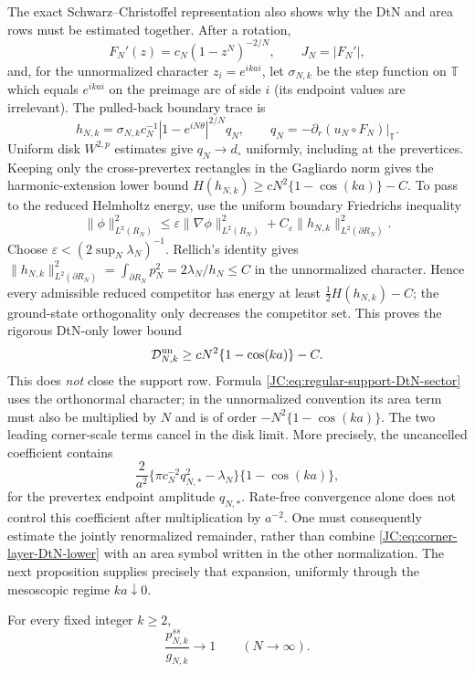 \begin{contract}
The exact Schwarz--Christoffel representation also shows why the DtN and
area rows must be estimated together.  After a rotation,
\[
 F_N'(z)=c_N(1-z^N)^{-2/N},\qquad J_N=|F_N'|,
\]
and, for the unnormalized character $z_i=e^{ikai}$, let
$\sigma_{N,k}$ be the step function on $\mathbb T$ which equals
$e^{ikai}$ on the preimage arc of side $i$ (its endpoint values are
irrelevant).  The pulled-back boundary trace is
\[
 h_{N,k}=\sigma_{N,k}c_N^{-1}
 |1-e^{iN\theta}|^{2/N}q_N,
 \qquad q_N=-\partial_r(u_N\circ F_N)|_{\mathbb T}.
\]
Uniform disk $W^{2,p}$ estimates give $q_N\to d_\circ$ uniformly,
including at the prevertices.  Keeping only the cross-prevertex
rectangles in the Gagliardo norm gives the harmonic-extension lower bound
$H(h_{N,k})\ge cN^2\{1-\cos(ka)\}-C$.  To pass to the reduced Helmholtz
energy, use the uniform boundary Friedrichs inequality
\[
 \|\phi\|_{L^2(R_N)}^2
 \le\varepsilon\|\nabla\phi\|_{L^2(R_N)}^2
 +C_\varepsilon\|h_{N,k}\|_{L^2(\partial R_N)}^2.
\]
Choose $\varepsilon<(2\sup_N\lambda_N)^{-1}$.  Rellich's identity gives
$\|h_{N,k}\|_{L^2(\partial R_N)}^2
=\int_{\partial R_N}p_N^2=2\lambda_N/h_N\le C$ in the unnormalized
character.  Hence every admissible reduced competitor has energy at least
$\frac12H(h_{N,k})-C$; the ground-state orthogonality only decreases the
competitor set.  This proves the rigorous DtN-only lower bound
\begin{equation}\label{JC:eq:corner-layer-DtN-lower}
 \mathscr D^{\rm un}_{N,k}
 \ge cN^2\{1-\cos(ka)\}-C.
\end{equation}
This does \emph{not} close the support row.  Formula
\eqref{JC:eq:regular-support-DtN-sector} uses the orthonormal character;
in the unnormalized convention its area term must also be multiplied by
$N$ and is of order
$-N^2\{1-\cos(ka)\}$.  The two leading corner-scale terms cancel in the
disk limit.  More precisely, the uncancelled coefficient contains
\[
 \frac{2}{a^2}
 \{\pi c_N^{-2}q_{N,*}^2-\lambda_N\}
 \{1-\cos(ka)\},
\]
for the prevertex endpoint amplitude $q_{N,*}$.  Rate-free convergence
alone does not control this coefficient after multiplication by $a^{-2}$.
One must consequently estimate the jointly renormalized remainder,
rather than combine
\eqref{JC:eq:corner-layer-DtN-lower} with an area symbol written in the other
normalization.  The next proposition supplies precisely that expansion,
uniformly through the mesoscopic regime $ka\downarrow0$.
\end{contract}

\begin{lemma}
\label{JC:lem:fixed-character-support-limit}
For every fixed integer $k\ge2$,
\begin{equation}\label{JC:eq:fixed-character-support-limit}
 \frac{p^{ss}_{N,k}}{g_{N,k}}\longrightarrow1
 \qquad(N\to\infty).
\end{equation}
\end{lemma}

